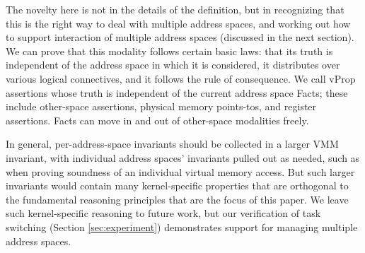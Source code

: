 The novelty here is not in the details of the definition, but in recognizing that this is the right way to deal with
multiple address spaces, and working out how to support interaction of multiple address spaces (discussed in the next section).
We can prove that this modality follows certain basic laws: that its truth is independent of the address
space in which it is considered,  it distributes over various logical connectives, and it follows the rule of
consequence.
We call \textsf{vProp} assertions whose truth is independent of the current address space
\textsf{Fact}s; these include other-space assertions, physical memory points-tos, and register assertions.
\textsf{Fact}s can move in and out of other-space modalities freely.

In general, per-address-space invariants should be collected in a larger
VMM invariant, with individual address spaces' invariants pulled out as needed, such as when proving
soundness of an individual virtual memory access.
But such larger invariants would contain many kernel-specific properties that are orthogonal
to the fundamental reasoning principles that are the focus of this paper.
We leave such kernel-specific reasoning to future work, but our verification of task switching
(Section \ref{sec:experiment}) demonstrates support for managing multiple address spaces.



  

